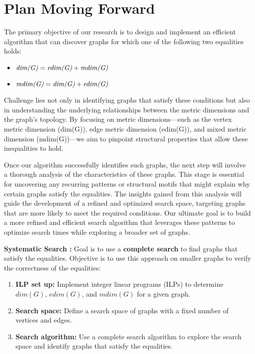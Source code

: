 \documentclass[12pt]{article}
\begin{document}
\section*{Plan Moving Forward}

The primary objective of our research is to design and implement an efficient algorithm that can discover graphs for which one of the following two equalities holds:
\begin{itemize}
  \item $\textit{\text{dim(G)}} = \textit{\text{edim(G)}} + \textit{\text{mdim(G)}}$
  \item $\textit{\text{mdim(G)}} = \textit{\text{dim(G)}} + \textit{\text{edim(G)}}$
\end{itemize}

Challenge lies not only in identifying graphs that satisfy these conditions but also in understanding the underlying relationships between the metric dimensions and the graph's topology. By focusing on metric dimensions—such as the vertex metric dimension (dim(G)), edge metric dimension (edim(G)), and mixed metric dimension (mdim(G))—we aim to pinpoint structural properties that allow these inequalities to hold.

\vspace{5pt}

Once our algorithm successfully identifies such graphs, the next step will involve a thorough analysis of the characteristics of these graphs. This stage is essential for uncovering any recurring patterns or structural motifs that might explain why certain graphs satisfy the equalities. The insights gained from this analysis will guide the development of a refined and optimized search space, targeting graphs that are more likely to meet the required conditions. Our ultimate goal is to build a more refined and efficient search algorithm that leverages these patterns to optimize search times while exploring a broader set of graphs.

\vspace{5pt}

\textbf{Systematic Search :} Goal is to use a \textbf{complete search} to find graphs that satisfy the equalities. Objective is to use this approach on smaller graphs to verify the correctness of the equalities:
\begin{enumerate}
  \item \textbf{ILP set up:} Implement integer linear programs (ILPs) to determine $dim(G)$, $edim(G)$, and $mdim(G)$ for a given graph.
  \item \textbf{Search space:} Define a search space of graphs with a fixed number of vertices and edges.
  \item \textbf{Search algorithm:} Use a complete search algorithm to explore the search space and identify graphs that satisfy the equalities.
\end{enumerate}
\newpage
\end{document}
